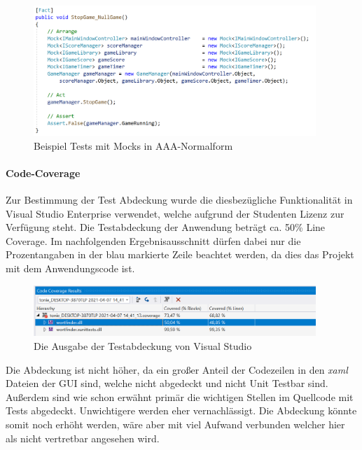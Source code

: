 \begin{figure}[!htb]
\centering
\includegraphics[width=0.95\textwidth]{Bilder/UnitTest.PNG}
\caption{\label{Abb:UnitTest}Beispiel Tests mit Mocks in AAA-Normalform}
\end{figure}

\newpage
\paragraph{Code-Coverage} Zur Bestimmung der Test Abdeckung wurde die diesbezügliche Funktionalität in Visual Studio Enterprise verwendet, welche aufgrund der Studenten Lizenz zur Verfügung steht. Die Testabdeckung der Anwendung beträgt ca. 50\% Line Coverage. Im nachfolgenden Ergebnisausschnitt dürfen dabei nur die Prozentangaben in der blau markierte Zeile beachtet werden, da dies das Projekt mit dem Anwendungscode ist.

\begin{figure}[!htb]
\centering
\includegraphics[width=0.95\textwidth]{Bilder/Testabdeckung.PNG}
\caption{\label{Abb:Testabdeckung}Die Ausgabe der Testabdeckung von Visual Studio}
\end{figure}

Die Abdeckung ist nicht höher, da ein großer Anteil der Codezeilen in den \textit{xaml} Dateien der GUI sind, welche nicht abgedeckt und nicht Unit Testbar sind. Außerdem sind wie schon erwähnt primär die wichtigen Stellen im Quellcode mit Tests abgedeckt. Unwichtigere werden eher vernachlässigt. Die Abdeckung könnte somit noch erhöht werden, wäre aber mit viel Aufwand verbunden welcher hier als nicht vertretbar angesehen wird.

\endinput